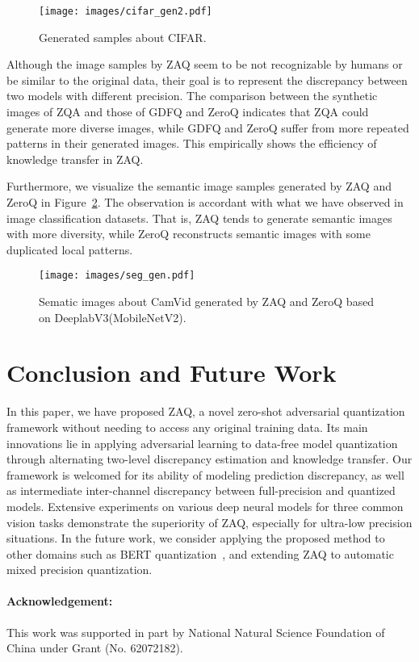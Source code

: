 \documentclass[final]{cvpr}
\begin{document}
\begin{figure}[!t]
  \centering
  \texttt{[image: images/cifar\_gen2.pdf]}
  \caption{Generated samples about CIFAR.}
  \label{fig:cifar_gen}
\end{figure}

Although the image samples by ZAQ seem to be not recognizable by humans or be similar to the original data, their goal is to represent the discrepancy between two models with different precision.
The comparison between the synthetic images of ZQA and those of GDFQ and ZeroQ indicates that ZQA could generate more diverse images, while GDFQ and ZeroQ suffer from more repeated patterns in their generated images.
This empirically shows the efficiency of knowledge transfer in ZAQ.

Furthermore, we visualize the semantic image samples generated by ZAQ and ZeroQ in Figure~\ref{fig:seg_gen}.
The observation is accordant with what we have observed in image classification datasets.
That is, ZAQ tends to generate semantic images with more diversity, while ZeroQ reconstructs semantic images with some duplicated local patterns. 

\begin{figure}[!t]
  \centering
  \texttt{[image: images/seg\_gen.pdf]}
  \caption{Sematic images about CamVid generated by ZAQ and ZeroQ based on DeeplabV3(MobileNetV2).}
  \label{fig:seg_gen}
\end{figure}


\section{Conclusion and Future Work}

In this paper, we have proposed ZAQ, a novel zero-shot adversarial quantization framework without needing to access any original training data.
Its main innovations lie in applying adversarial learning to data-free model quantization through alternating two-level discrepancy estimation and knowledge transfer. Our framework is welcomed for its ability of modeling prediction discrepancy, as well as intermediate inter-channel discrepancy between full-precision and quantized models. 
Extensive experiments on various deep neural models for three common vision tasks demonstrate the superiority of ZAQ, especially for ultra-low precision situations.
In the future work, we consider applying the proposed method to other domains such as BERT quantization~\cite{shen2020q}, and extending ZAQ to automatic mixed precision quantization.

\vspace{-2mm}
\paragraph{Acknowledgement:} This work was supported in part by National Natural Science Foundation of China under Grant (No. 62072182).


{\small


}
\end{document}
